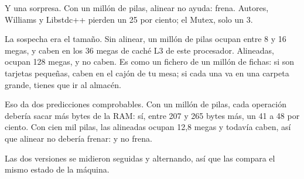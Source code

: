 Y una sorpresa. Con un millón de pilas, alinear no ayuda: frena. Autores, Williams y Libstdc++ pierden un 25 por ciento; el Mutex, solo un 3.

La sospecha era el tamaño. Sin alinear, un millón de pilas ocupan entre 8 y 16 megas, y caben en los 36 megas de caché L3 de este procesador. Alineadas, ocupan 128 megas, y no caben. Es como un fichero de un millón de fichas: si son tarjetas pequeñas, caben en el cajón de tu mesa; si cada una va en una carpeta grande, tienes que ir al almacén.

Eso da dos predicciones comprobables. Con un millón de pilas, cada operación debería sacar más bytes de la RAM: sí, entre 207 y 265 bytes más, un 41 a 48 por ciento. Con cien mil pilas, las alineadas ocupan 12,8 megas y todavía caben, así que alinear no debería frenar: y no frena.

Las dos versiones se midieron seguidas y alternando, así que las compara el mismo estado de la máquina.
